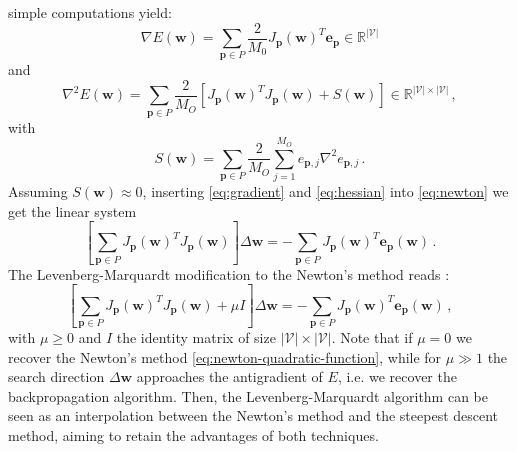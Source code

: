\documentclass[11pt, a4paper]{report}
\numberwithin{equation}{chapter}
\theoremstyle{theorem}
\theoremstyle{definition}
\numberwithin{figure}{section}
\begin{document}
		simple computations yield:
		\begin{equation}
			\label{eq:gradient}
			\nabla E(\boldsymbol{w}) = \sum_{\boldsymbol{p} \in P} \dfrac{2}{M_0} J_{\boldsymbol{p}}(\boldsymbol{w})^T \boldsymbol{e}_{\boldsymbol{p}} \in \mathbb{R}^{|\mathcal{V}|}
		\end{equation}
		and
		\begin{equation}
			\label{eq:hessian}
			\nabla^2 E(\boldsymbol{w}) = \sum_{\boldsymbol{p} \in P} \dfrac{2}{M_O} \left[ J_{\boldsymbol{p}}(\boldsymbol{w})^T J_{\boldsymbol{p}}(\boldsymbol{w}) + S(\boldsymbol{w}) \right] \in \mathbb{R}^{|\mathcal{V}| \times |\mathcal{V}|} \, ,
		\end{equation}
		with
		\begin{equation*}
			S(\boldsymbol{w}) = \sum_{\boldsymbol{p} \in P} \dfrac{2}{M_O} \sum_{j = 1}^{M_O} e_{\boldsymbol{p},j} \nabla^2 e_{\boldsymbol{p},j} \, .
		\end{equation*}
		Assuming $S(\boldsymbol{w}) \approx 0$, inserting \eqref{eq:gradient} and \eqref{eq:hessian} into \eqref{eq:newton} we get the linear system
		\begin{equation}
			\label{eq:newton-quadratic-function}
			\left[ \sum_{\boldsymbol{p} \in P} J_{\boldsymbol{p}}(\boldsymbol{w})^T J_{\boldsymbol{p}}(\boldsymbol{w}) \right] \Delta \boldsymbol{w} = - \sum_{\boldsymbol{p} \in P} J_{\boldsymbol{p}}(\boldsymbol{w})^T \boldsymbol{e}_{\boldsymbol{p}}(\boldsymbol{w}) \, .
		\end{equation} 
		The Levenberg-Marquardt modification to the Newton's method reads \cite{Hag94, Mar63}:
		\begin{equation}
			\label{eq:levenberg-marquardt}
			\left[ \sum_{\boldsymbol{p} \in P} J_{\boldsymbol{p}}(\boldsymbol{w})^T J_{\boldsymbol{p}}(\boldsymbol{w}) + \mu I \right] \Delta \boldsymbol{w} = - \sum_{\boldsymbol{p} \in P} J_{\boldsymbol{p}}(\boldsymbol{w})^T \boldsymbol{e}_{\boldsymbol{p}}(\boldsymbol{w}) \, ,
		\end{equation}
		with $\mu \geq 0$ and $I$ the identity matrix of size $|\mathcal{V}| \times |\mathcal{V}|$. Note that if $\mu = 0$ we recover the Newton's method \eqref{eq:newton-quadratic-function}, while for $\mu \gg 1$ the search direction $\Delta \boldsymbol{w}$ approaches the antigradient of $E$, i.e. we recover the backpropagation algorithm. Then, the Levenberg-Marquardt algorithm can be seen as an interpolation between the Newton's method and the steepest descent method, aiming to retain the advantages of both techniques.
		
\end{document}
